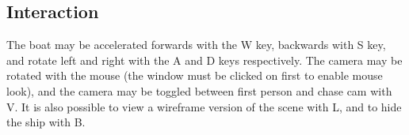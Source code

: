 \documentclass[a4paper,11pt]{article}
\begin{document}
\subsection{Interaction}
The boat may be accelerated forwards with the W key, backwards with S key, and rotate left and right with the A and D keys respectively. The camera may be rotated with the mouse (the window must be clicked on first to enable mouse look), and the camera may be toggled between first person and chase cam with V. It is also possible to view a wireframe version of the scene with L, and to hide the ship with B.
\end{document}
